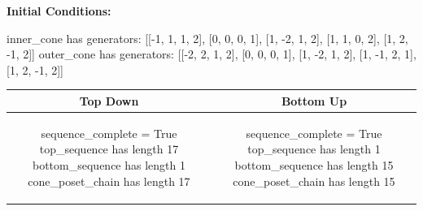 \documentclass[10pt]{article}
\begin{document}
\textbf{Initial Conditions:}
\begin{SAGE}
inner_cone has generators: 
[[-1, 1, 1, 2], [0, 0, 0, 1], [1, -2, 1, 2], [1, 1, 0, 2], [1, 2, -1, 2]]
outer_cone has generators: 
[[-2, 2, 1, 2], [0, 0, 0, 1], [1, -2, 1, 2], [1, -1, 2, 1], [1, 2, -1, 2]]

\end{SAGE}
\begin{tabular}{c|c}
\textbf{Top Down} & \textbf{Bottom Up} \\ \hline  
\begin{SAGE}
sequence_complete = True
top_sequence has length 17
bottom_sequence has length 1
cone_poset_chain has length 17
\end{SAGE} 
&
\begin{SAGE}
sequence_complete = True
top_sequence has length 1
bottom_sequence has length 15
cone_poset_chain has length 15
\end{SAGE} 
\\ \hline


\end{tabular}
\end{document}

